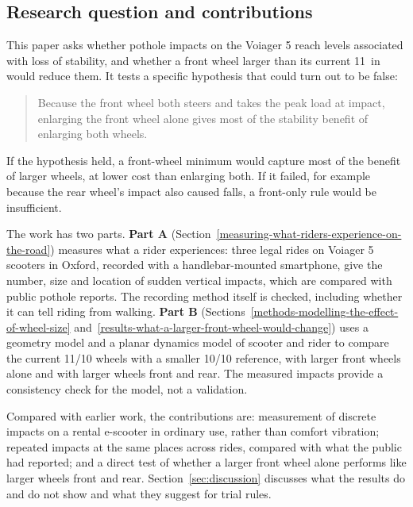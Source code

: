 \subsection{Research question and contributions}

This paper asks whether pothole impacts on the Voiager 5 reach levels associated with loss of
stability, and whether a front wheel larger than its current 11~in would reduce them. It
tests a specific
hypothesis that could turn out to be false:

\begin{quote}
Because the front wheel both steers and takes the peak load at impact, enlarging the front
wheel alone gives most of the stability benefit of enlarging both wheels.
\end{quote}

If the hypothesis held, a front-wheel minimum would capture most of the benefit of larger
wheels, at lower cost than enlarging both. If it failed, for example
because the rear wheel's impact also caused falls, a front-only rule would be insufficient.

The work has two parts. \textbf{Part A} (Section~\ref{measuring-what-riders-experience-on-the-road})
measures what a rider experiences: three legal rides on Voiager 5 scooters in Oxford, recorded
with a handlebar-mounted smartphone, give the number, size and location of sudden vertical
impacts, which are compared with public pothole reports. The recording method itself is checked,
including whether it can tell riding from walking. \textbf{Part B}
(Sections~\ref{methods-modelling-the-effect-of-wheel-size}
and~\ref{results-what-a-larger-front-wheel-would-change}) uses a geometry model and a planar
dynamics model of scooter and rider to compare the current 11/10 wheels with a smaller
10/10 reference, with larger front wheels alone and with larger wheels front and rear. The measured impacts provide a consistency check
for the model, not a validation.

Compared with earlier work, the contributions are: measurement of discrete impacts on a rental
e-scooter in ordinary use, rather than comfort vibration; repeated impacts at the same places
across rides, compared with what the public had reported; and a direct test of whether a
larger front wheel alone performs like larger wheels front and rear. Section~\ref{sec:discussion}
discusses what the results do and do not show and what they suggest for trial rules.
